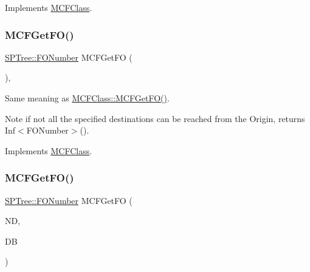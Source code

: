 Implements \mbox{\hyperlink{class_m_c_f_class_a1b0d5b8f2dfd729783e7c0fd604dc896}{M\+C\+F\+Class}}.

\mbox{\label{class_s_p_tree_a55b9b095d557852a91b68c973236518a}} 
\subsubsection{\texorpdfstring{M\+C\+F\+Get\+F\+O()}{MCFGetFO()}\hspace{0.1cm}{\footnotesize\ttfamily [1/2]}}
{\footnotesize\ttfamily \mbox{\hyperlink{class_m_c_f_class_af5ee7b3099b0bc780a6a4b43629488fa}{S\+P\+Tree\+::\+F\+O\+Number}} M\+C\+F\+Get\+FO (\begin{DoxyParamCaption}\item[{void}]{ }\end{DoxyParamCaption})\hspace{0.3cm}{\ttfamily [override]}, {\ttfamily [virtual]}}

Same meaning as \mbox{\hyperlink{class_m_c_f_class_a109d7c021feda837d8ca5051fc24b6ea}{M\+C\+F\+Class\+::\+M\+C\+F\+Get\+F\+O()}}.

\begin{DoxyNote}{Note}
if not all the specified destinations can be reached from the Origin, returns Inf$<$\+F\+O\+Number$>$(). 
\end{DoxyNote}


Implements \mbox{\hyperlink{class_m_c_f_class_a109d7c021feda837d8ca5051fc24b6ea}{M\+C\+F\+Class}}.

\mbox{\label{class_s_p_tree_a412b2a0ccb6e2faacb7c2e5081d4e016}} 
\subsubsection{\texorpdfstring{M\+C\+F\+Get\+F\+O()}{MCFGetFO()}\hspace{0.1cm}{\footnotesize\ttfamily [2/2]}}
{\footnotesize\ttfamily \mbox{\hyperlink{class_m_c_f_class_af5ee7b3099b0bc780a6a4b43629488fa}{S\+P\+Tree\+::\+F\+O\+Number}} M\+C\+F\+Get\+FO (\begin{DoxyParamCaption}\item[{\mbox{\hyperlink{class_m_c_f_class_ad53d6229d7ec28555a9c9c2fd9abf773}{Index}}}]{ND,  }\item[{\mbox{\hyperlink{class_m_c_f_class_a81575b2d4e4d5636b17170432150ae69}{c\+Index\+\_\+\+Set}}}]{DB }\end{DoxyParamCaption})}

